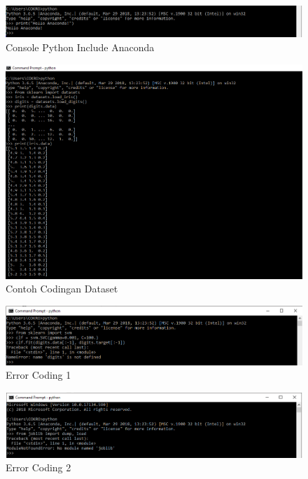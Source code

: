 \begin{enumerate}
\begin{itemize}
\begin{figure}[ht]
      \centerline{\includegraphics[width=1\textwidth]
      {figures/c3}}
      \caption{Console Python Include Anaconda}
      \label{c3}
      \end{figure}

\begin{figure}[ht]
      \centerline{\includegraphics[width=1\textwidth]
      {figures/c4}}
      \caption{Contoh Codingan Dataset}
      \label{c4}
      \end{figure}

\begin{figure}[ht]
      \centerline{\includegraphics[width=1\textwidth]
      {figures/c5}}
      \caption{Error Coding 1}
      \label{c5}
      \end{figure}

\begin{figure}[ht]
      \centerline{\includegraphics[width=1\textwidth]
      {figures/c6}}
      \caption{Error Coding 2}
      \label{c6}
      \end{figure}



\end{itemize}
\end{enumerate}
